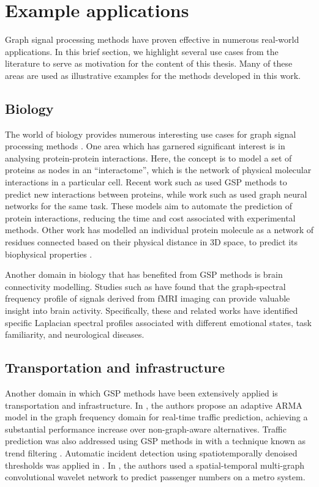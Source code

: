 \newpage

\section{Example applications}

Graph signal processing methods have proven effective in numerous real-world applications. In this brief section, we highlight several use cases from the literature to serve as motivation for the content of this thesis. Many of these areas are used as illustrative examples for the methods developed in this work.


\subsection{Biology}

The world of biology provides numerous interesting use cases for graph signal processing methods \citep{Li2023}. One area which has garnered significant interest is in analysing protein-protein interactions. Here, the concept is to model a set of proteins as nodes in an ``interactome'', which is the network of physical molecular interactions in a particular cell. Recent work such as \cite{Colonnese2021} used GSP methods to predict new interactions between proteins, while work such as \cite{Jha2022} used graph neural networks for the same task. These models aim to automate the prediction of protein interactions, reducing the time and cost associated with experimental methods. Other work has modelled an individual protein molecule as a network of residues connected based on their physical distance in 3D space, to predict its biophysical properties \citep{Srivastava2023}. 

Another domain in biology that has benefited from GSP methods is brain connectivity modelling. Studies such as \cite{Goldsberry2017, Atasoy2016, Menoret2017, Itani2021} have found that the graph-spectral frequency profile of signals derived from fMRI imaging can provide valuable insight into brain activity. Specifically, these and related works have identified specific Laplacian spectral profiles associated with different emotional states, task familiarity, and neurological diseases.

\subsection{Transportation and infrastructure}

Another domain in which GSP methods have been extensively applied is transportation and infrastructure. In \cite{Hasanzadeh2017}, the authors propose an adaptive ARMA model in the graph frequency domain for real-time traffic prediction, achieving a substantial performance increase over non-graph-aware alternatives. Traffic prediction was also addressed using GSP methods in \cite{Chakraborty2017} with a technique known as trend filtering \citep{Wang2016}. Automatic incident detection using spatiotemporally denoised thresholds was applied in \citep{Chakraborty2019}. In \cite{Xiu2022}, the authors used a spatial-temporal multi-graph convolutional wavelet network to predict passenger numbers on a metro system.

